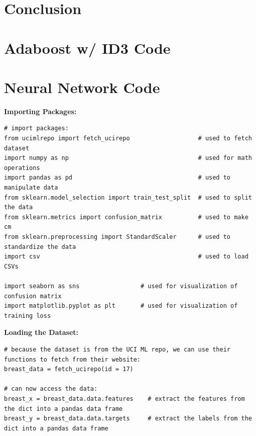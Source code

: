 \documentclass[a4paper]{article}
\begin{document}
\newpage
\section{Conclusion}

\newpage
\nocite{*}



\renewcommand{\thesection}{Appendix \Alph{section}: \hspace{-4mm}}
\setcounter{section}{0} %

\newpage
\section{Adaboost w/ ID3 Code}

\newpage
\section{Neural Network Code}
\textbf{Importing Packages:}
\begin{lstlisting}[basicstyle= \scriptsize]
# import packages:
from ucimlrepo import fetch_ucirepo                   # used to fetch dataset
import numpy as np                                    # used for math operations
import pandas as pd                                   # used to manipulate data
from sklearn.model_selection import train_test_split  # used to split the data
from sklearn.metrics import confusion_matrix          # used to make cm
from sklearn.preprocessing import StandardScaler      # used to standardize the data
import csv                                            # used to load CSVs

import seaborn as sns                 # used for visualization of confusion matrix
import matplotlib.pyplot as plt       # used for visualization of training loss
\end{lstlisting} 

\textbf{Loading the Dataset:}
\begin{lstlisting}[basicstyle= \scriptsize]
# because the dataset is from the UCI ML repo, we can use their functions to fetch from their website:
breast_data = fetch_ucirepo(id = 17)

# can now access the data:
breast_x = breast_data.data.features    # extract the features from the dict into a pandas data frame
breast_y = breast_data.data.targets     # extract the labels from the dict into a pandas data frame
\end{lstlisting}
\end{document}
